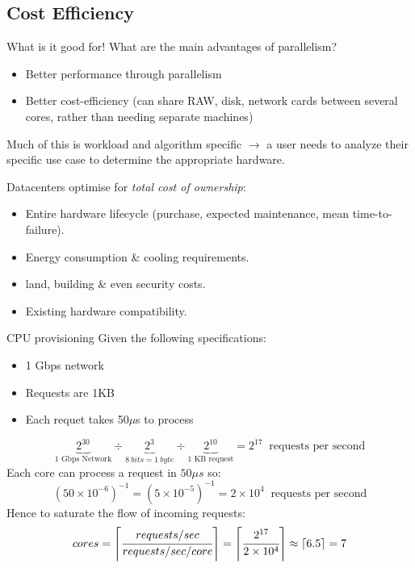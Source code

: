 \subsection{Cost Efficiency}
\begin{examplebox}{What is it good for!}
    What are the main advantages of parallelism?
    \tcblower
    \begin{itemize}
        \item Better performance through parallelism
        \item Better cost-efficiency (can share RAW, disk, network cards between several cores, rather than needing separate machines)
    \end{itemize}
    Much of this is workload and algorithm specific $\to$ a user needs to analyze their specific use case to determine the appropriate hardware.
\end{examplebox}
Datacenters optimise for \textit{total cost of ownership}:
\begin{itemize}
    \item Entire hardware lifecycle (purchase, expected maintenance, mean time-to-failure).
    \item Energy consumption \& cooling requirements.
    \item land, building \& even security costs.
    \item Existing hardware compatibility.
\end{itemize}

\begin{examplebox}{CPU provisioning}
    Given the following specifications:
    \begin{itemize}
        \item 1 Gbps network
        \item Requests are 1KB
        \item Each requet takes 50$\mu$s to process
    \end{itemize}
    \tcblower
    \[\underbrace{2^{30}}_{\text{1 Gbps Network}}  \div \underbrace{2^3}_{8 \ bits = 1 \ byte} \div \underbrace{2^10}_{\text{1 KB request}} = 2^{17} \ \text{ requests per second}\]
    Each core can process a request in $50\mu s$ so:
    \[(50 \times 10^{-6})^{-1} = (5 \times 10^{-5})^{-1} = 2 \times 10^4 \ \text{ requests per second}\]
    Hence to saturate the flow of incoming requests:
    \[cores = \left\lceil \cfrac{requests / sec}{requests / sec / core} \right\rceil = \left\lceil \cfrac{2^{17}}{2 \times 10^4} \right\rceil \approx \lceil 6.5 \rceil = 7\]
\end{examplebox}

